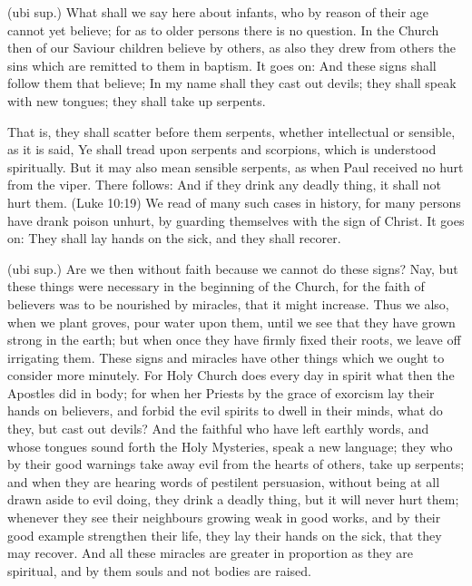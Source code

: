  (ubi sup.) What shall we say here about infants, who by reason of their age cannot yet believe; for as to older persons there is no question. In the Church then of our Saviour children believe by others, as also they drew from others the sins which are remitted to them in baptism. It goes on: And these signs shall follow them that believe; In my name shall they cast out devils; they shall speak with new tongues; they shall take up serpents.

 That is, they shall scatter before them serpents, whether intellectual or sensible, as it is said, Ye shall tread upon serpents and scorpions, which is understood spiritually. But it may also mean sensible serpents, as when Paul received no hurt from the viper. There follows: And if they drink any deadly thing, it shall not hurt them. (Luke 10:19) We read of many such cases in history, for many persons have drank poison unhurt, by guarding themselves with the sign of Christ. It goes on: They shall lay hands on the sick, and they shall recorer.

 (ubi sup.) Are we then without faith because we cannot do these signs? Nay, but these things were necessary in the beginning of the Church, for the faith of believers was to be nourished by miracles, that it might increase. Thus we also, when we plant groves, pour water upon them, until we see that they have grown strong in the earth; but when once they have firmly fixed their roots, we leave off irrigating them. These signs and miracles have other things which we ought to consider more minutely. For Holy Church does every day in spirit what then the Apostles did in body; for when her Priests by the grace of exorcism lay their hands on believers, and forbid the evil spirits to dwell in their minds, what do they, but cast out devils? And the faithful who have left earthly words, and whose tongues sound forth the Holy Mysteries, speak a new language; they who by their good warnings take away evil from the hearts of others, take up serpents; and when they are hearing words of pestilent persuasion, without being at all drawn aside to evil doing, they drink a deadly thing, but it will never hurt them; whenever they see their neighbours growing weak in good works, and by their good example strengthen their life, they lay their hands on the sick, that they may recover. And all these miracles are greater in proportion as they are spiritual, and by them souls and not bodies are raised.

 

